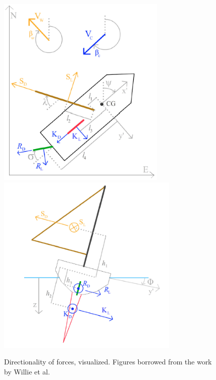 \documentclass[conference]{IEEEtran}
\begin{document}
\begin{figure}[ht]
    \centering
    \includegraphics[width=.9\columnwidth]{fig/force_visualization_top.png}
    \includegraphics[width=.9\columnwidth]{fig/force_visualization_back.png}
    \caption{Directionality of forces, visualized. Figures borrowed from the work by Willie et al. \cite{ModelingCourseControl}}
    \label{Force Directionality}
\end{figure}
\end{document}
